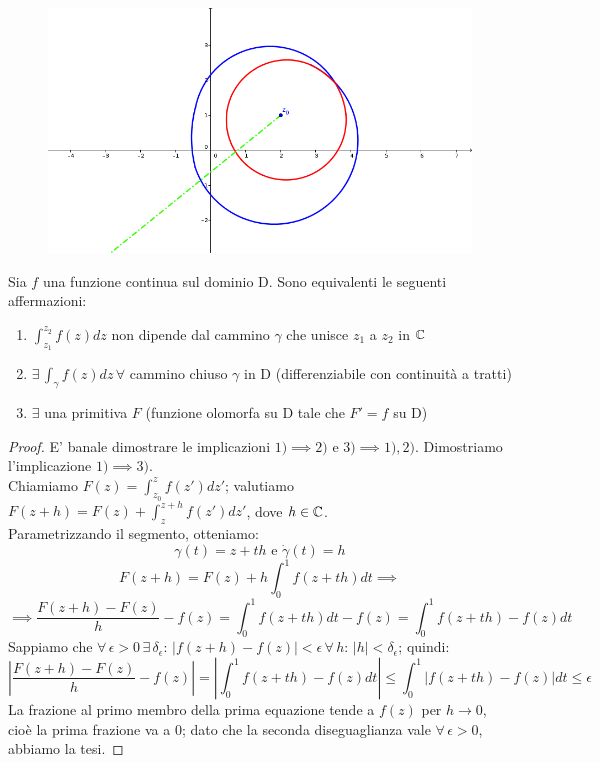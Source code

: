 \begin{figure}[h!]
  \centering
    \includegraphics[width=0.75 \textwidth]{immagini/indice.png}
\end{figure}
\begin{teorema}
Sia $f$ una funzione continua sul dominio D. Sono equivalenti le seguenti affermazioni:
\begin{enumerate}
\item $\int_{z_1}^{z_2} f(z)dz$ non dipende dal cammino $\gamma$ che unisce $z_1$ a $z_2$ in $\mathbb{C}$
\item $\exists \, \int_{\gamma} f(z)dz \, \forall$ cammino chiuso $\gamma$ in D (differenziabile con continuità a tratti)
\item $\exists$ una primitiva $F$ (funzione olomorfa su D tale che $F'=f$ su D)
\end{enumerate}
\end{teorema}
\begin{proof}
E' banale dimostrare le implicazioni $1) \implies 2)$ e $3) \implies 1),2)$. Dimostriamo l'implicazione $1) \implies 3)$.\\Chiamiamo $F(z)=\int_{z_0}^{z} f(z')dz'$; valutiamo $F(z+h)=F(z)+\int_{z}^{z+h} f(z')dz'$, dove $h\in \mathbb{C}$. \\Parametrizzando il segmento, otteniamo:
$$\gamma(t)=z+th \text{ e } \dot{\gamma}(t)=h$$
$$F(z+h)=F(z)+h \int_{0}^{1} f(z+th)dt \implies$$
$$\implies \frac{F(z+h)-F(z)}{h}-f(z)=\int_{0}^{1} f(z+th)dt-f(z)=\int_{0}^{1} f(z+th)-f(z)dt$$
Sappiamo che $\forall \, \epsilon >0 \, \exists \, \delta_{\epsilon}: \, |f(z+h)-f(z)|<\epsilon \, \forall \, h: \, |h|<\delta_{\epsilon}$; quindi:
$$\left|\frac{F(z+h)-F(z)}{h}-f(z)\right| = \left|\int_{0}^{1} f(z+th)-f(z)dt\right| \leq \int_{0}^{1} |f(z+th)-f(z)|dt \leq \epsilon $$
La frazione al primo membro della prima equazione tende a $f(z)$ per $h \to 0$, cioè la prima frazione va a 0; dato che la seconda diseguaglianza vale $\forall \, \epsilon > 0$, abbiamo la tesi.
\end{proof}

